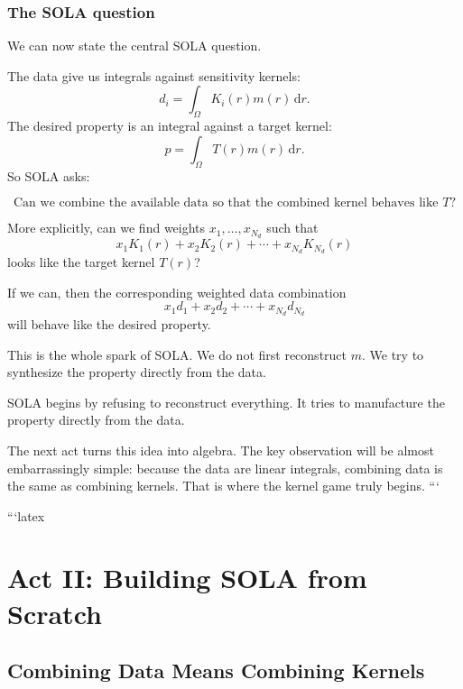 \documentclass[11pt,openany]{book}
\theoremstyle{definition}
\theoremstyle{remark}
\newcommand{\dd}{\,\mathrm d}
\begin{document}
\section{The SOLA question}

We can now state the central SOLA question.

The data give us integrals against sensitivity kernels:
\[
  d_i
  =
  \int_\Omega K_i(r)m(r)\dd r.
\]
The desired property is an integral against a target kernel:
\[
  p
  =
  \int_\Omega T(r)m(r)\dd r.
\]
So SOLA asks:

\[
  \text{Can we combine the available data so that the combined kernel behaves like }T?
\]

More explicitly, can we find weights \(x_1,\dots,x_{N_d}\) such that
\[
  x_1K_1(r)+x_2K_2(r)+\cdots+x_{N_d}K_{N_d}(r)
\]
looks like the target kernel \(T(r)\)?

If we can, then the corresponding weighted data combination
\[
  x_1d_1+x_2d_2+\cdots+x_{N_d}d_{N_d}
\]
will behave like the desired property.

This is the whole spark of SOLA. We do not first reconstruct \(m\). We try to synthesize the
property directly from the data.

\begin{lessonbox}
SOLA begins by refusing to reconstruct everything. It tries to manufacture the property directly
from the data.
\end{lessonbox}

The next act turns this idea into algebra. The key observation will be almost embarrassingly
simple: because the data are linear integrals, combining data is the same as combining kernels.
That is where the kernel game truly begins.
```


```latex

\part{Act II: Building SOLA from Scratch}

\chapter{Combining Data Means Combining Kernels}
\end{document}
